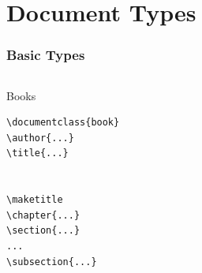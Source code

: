 
\section{Document Types}

\begin{frame}
\frametitle{Basic Types}
\begin{columns}
\begin{column}{.35\textwidth}
\begin{beamerboxesrounded}[width=\linewidth]{Books}
\begin{lstlisting}[moretexcs={chapter,subsection,maketitle}, basicstyle={\ttfamily}, emph={book}]
\documentclass{book}
\author{...}
\title{...}


\maketitle
\chapter{...}
\section{...}
...
\subsection{...}


\end{lstlisting}
\end{beamerboxesrounded}
\end{column}
\end{columns}
\end{frame}
